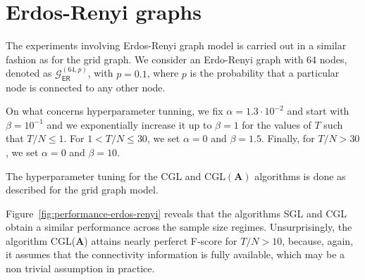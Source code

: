 \section{Erdos-Renyi graphs}
The experiments involving Erdos-Renyi graph model is carried out in a similar fashion
as for the grid graph. We consider an Erdo-Renyi graph with 64 nodes, denoted as
$\mathcal{G}^{(64, p)}_{\mathsf{ER}}$, with $p = 0.1$, where $p$ is the probability that
a particular node is connected to any other node.

On what concerns hyperparameter tunning, we fix $\alpha = 1.3\cdot 10^{-2}$ and start with
$\beta = 10^{-1}$ and we exponentially increase it up to $\beta = 1$ for the values of $T$
such that $T / N \leq 1$. For $1 < T / N \leq 30$, we set $\alpha = 0$ and $\beta = 1.5$.
Finally, for $T / N > 30$, we set $\alpha = 0$ and $\beta = 10$.

The hyperparameter tuning for the \textsf{CGL} and \textsf{CGL}$(\mathbf{A})$ algorithms
is done as described for the grid graph model.

Figure~\ref{fig:performance-erdos-renyi} reveals that the algorithms \textsf{SGL}
and \textsf{CGL} obtain a similar performance across the sample size regimes. Unsurprisingly,
the algorithm \textsf{CGL}($\mathbf{A}$) attains nearly perferct F-score for $T / N > 10$,
because, again, it assumes that the connectivity information is fully available, which may be
a non trivial assumption in practice.

